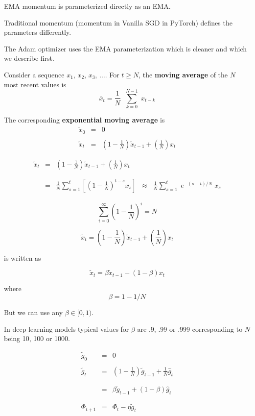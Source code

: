 {\vfill
EMA momentum is parameterized directly as an EMA.

\vfill
Traditional momentum (momentum in Vanilla SGD in PyTorch) defines the parameters differently.

\vfill
The Adam optimizer uses the EMA parameterization which is cleaner and which we describe first.

Consider a sequence $x_1$, $x_2$, $x_3$, $\ldots$.
\vfill
For $t \geq N$, the {\bf moving average} of the $N$ most recent values is
$$\overline{x}_t = \frac{1}{N} \;\; \sum_{k = 0}^{N-1}\; x_{t-k}$$

\vfill
The corresponding {\bf exponential moving average} is
\begin{eqnarray*}
\tilde{x}_0 & = & 0 \\
\\
\tilde{x}_t & = & \left(1-\frac{1}{N}\right)\tilde{x}_{t-1} + \left(\frac{1}{N}\right)x_t
\end{eqnarray*}

\begin{eqnarray*}
\tilde{x}_t & = & \left(1-\frac{1}{N}\right)\tilde{x}_{t-1} + \left(\frac{1}{N}\right)x_t \\
\\
\\
&= & \frac{1}{N}\sum_{s=1}^t \left[\left(1-\frac{1}{N}\right)^{t-s} x_s\right] \;\;\approx\;\; \frac{1}{N} \sum_{s=1}^t\;e^{-(s-t)/N} \;x_s 
\end{eqnarray*}

\vfill
$$\sum_{i=0}^\infty \left(1-\frac{1}{N}\right)^i = N$$


$$\tilde{x}_t = \left(1-\frac{1}{N}\right)\tilde{x}_{t-1} + \left(\frac{1}{N}\right)x_t$$

\vfill
is written as

$$\tilde{x}_t = \beta\tilde{x}_{t-1} + (1-\beta)x_t$$

\vfill
where
$$\beta = 1 - 1/N$$

\vfill
But we can use any $\beta \in [0,1)$.

\vfill
In deep learning models typical values for $\beta$ are .9, .99 or .999 corresponding to $N$ being 10, 100 or 1000.


\begin{eqnarray*}
  \tilde{g}_0 & = & 0 \\
  \\
  \tilde{g}_{t} & = & \left(1-\frac{1}{N}\right)\tilde{g}_{t-1} + \frac{1}{N} \hat{g}_t \\
  \\
  \\
  & = & \beta \tilde{g}_{t-1} + (1-\beta)\hat{g}_t \\
  \\             
  \\
  \Phi_{t+1} & =  & \Phi_t - \eta\tilde{g}_{t}
\end{eqnarray*}


}
